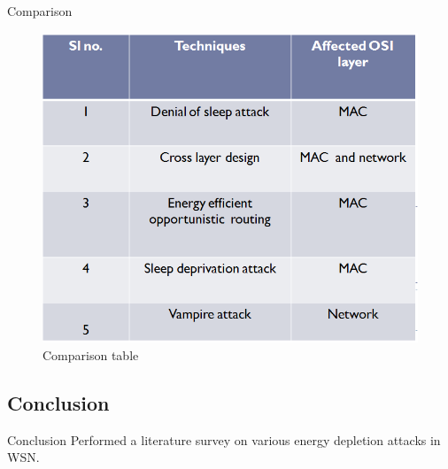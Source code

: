  \begin{frame}{Comparison}
  \begin{figure}[hbtp]
  \center
  \includegraphics[scale=0.5]{tab.png}
  \caption{Comparison table} 
  \end{figure}
 \end{frame}

 \subsection{Conclusion}
\begin{frame}{Conclusion}
Performed a literature survey on various energy depletion attacks in WSN.
\end{frame}

